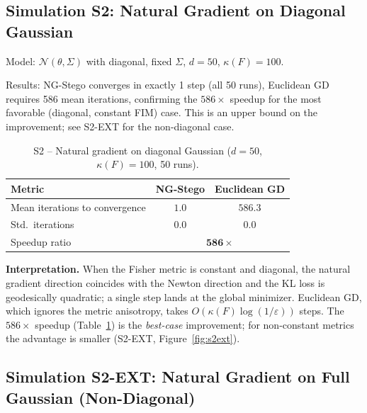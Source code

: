 \documentclass[a4paper,fleqn]{cas-dc}
\begin{document}
\subsection{Simulation S2: Natural Gradient on Diagonal Gaussian}
\label{sec:sim_s2}

Model: $\mathcal{N}(\theta, \Sigma)$ with diagonal, fixed $\Sigma$,
$d=50$, $\kappa(F)=100$.

Results: NG-Stego converges in exactly 1 step (all 50 runs),
Euclidean GD requires 586 mean iterations, confirming the
$586\times$ speedup for the most favorable (diagonal, constant FIM) case.
This is an upper bound on the improvement; see S2-EXT for the
non-diagonal case.

\begin{table}[ht]
  \centering
  \caption{S2 -- Natural gradient on diagonal Gaussian ($d=50$,
    $\kappa(F)=100$, 50 runs).}
  \label{tab:s2}
  \begin{tabular}{lcc}
    \toprule
    Metric & NG-Stego & Euclidean GD \\
    \midrule
    Mean iterations to convergence & $\mathbf{1.0}$ & $586.3$ \\
    Std.\ iterations & $0.0$ & $0.0$ \\
    Speedup ratio & \multicolumn{2}{c}{$\mathbf{586\times}$} \\
    \bottomrule
  \end{tabular}
\end{table}

\textbf{Interpretation.}
When the Fisher metric is constant and diagonal, the natural gradient
direction coincides with the Newton direction and the KL loss is
geodesically quadratic; a single step lands at the global minimizer.
Euclidean GD, which ignores the metric anisotropy, takes
$O(\kappa(F)\log(1/\varepsilon))$ steps.  The $586\times$ speedup
(Table~\ref{tab:s2}) is the \emph{best-case} improvement; for
non-constant metrics the advantage is smaller (S2-EXT,
Figure~\ref{fig:s2ext}).

\subsection{Simulation S2-EXT: Natural Gradient on Full Gaussian (Non-Diagonal)}
\label{sec:sim_s2ext}
\end{document}
